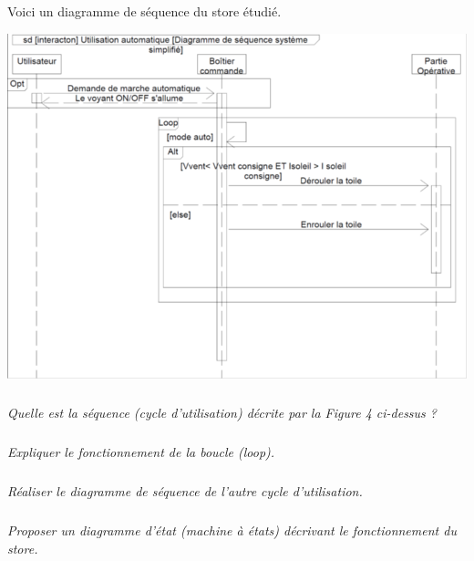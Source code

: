 \documentclass[10pt]{article}
\begin{document}
Voici un diagramme de séquence du store étudié.

\begin{center}
\includegraphics[width=\textwidth]{images/store_03}
\end{center}

\setcounter{subparagraph}{0}
\subparagraph{}
\textit{Quelle est la séquence (cycle d’utilisation) décrite par la Figure 4 ci-dessus ?}

\subparagraph{}
\textit{Expliquer le fonctionnement de la boucle (loop).}

\subparagraph{}
\textit{Réaliser le diagramme de séquence de l’autre cycle d’utilisation.}
\subparagraph{}
\textit{Proposer un diagramme d’état (machine à états) décrivant le fonctionnement du store.}


\end{document}
